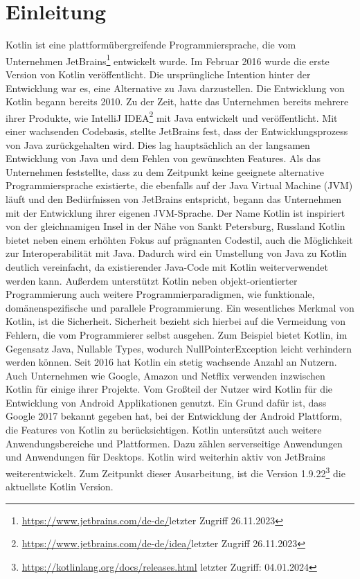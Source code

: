 \documentclass{article}
\begin{document}
\section{Einleitung}
Kotlin ist eine plattformübergreifende Programmiersprache, die vom Unternehmen JetBrains\footnote{\url{https://www.jetbrains.com/de-de/}letzter Zugriff 26.11.2023} entwickelt wurde. Im Februar 2016 wurde die erste Version von Kotlin veröffentlicht. Die ursprüngliche Intention hinter der Entwicklung war es, eine Alternative zu Java darzustellen. Die Entwicklung von Kotlin begann bereits 2010. Zu der Zeit, hatte das Unternehmen bereits mehrere ihrer Produkte, wie IntelliJ IDEA\footnote{\url{https://www.jetbrains.com/de-de/idea/}letzter Zugriff 26.11.2023} mit Java entwickelt und veröffentlicht. Mit einer wachsenden Codebasis, stellte JetBrains fest, dass der Entwicklungsprozess von Java zurückgehalten wird. Dies lag hauptsächlich an der langsamen Entwicklung von Java und dem Fehlen von gewünschten Features. Als das Unternehmen feststellte, dass zu dem Zeitpunkt keine geeignete alternative Programmiersprache existierte, die ebenfalls auf der Java Virtual Machine (JVM) läuft und den Bedürfnissen von JetBrains entspricht, begann das Unternehmen mit der Entwicklung ihrer eigenen JVM-Sprache. Der Name Kotlin ist inspiriert von der gleichnamigen Insel in der Nähe von Sankt Petersburg, Russland\cite{Kotlin_In-D} \newline
Kotlin bietet neben einem erhöhten Fokus auf prägnanten Codestil, auch die Möglichkeit zur Interoperabilität mit Java. Dadurch wird ein Umstellung von Java zu Kotlin deutlich vereinfacht, da existierender Java-Code mit Kotlin weiterverwendet werden kann. Außerdem unterstützt Kotlin neben objekt-orientierter Programmierung auch weitere Programmierparadigmen, wie funktionale, domänenspezifische und parallele Programmierung. Ein wesentliches Merkmal von Kotlin, ist die Sicherheit. Sicherheit bezieht sich hierbei auf die Vermeidung von Fehlern, die vom Programmierer selbst ausgehen. Zum Beispiel bietet Kotlin, im Gegensatz Java, Nullable Types, wodurch NullPointerException leicht verhindern werden können. Seit 2016 hat Kotlin ein stetig wachsende Anzahl an Nutzern. Auch Unternehmen wie Google, Amazon und Netflix verwenden inzwischen Kotlin für einige ihrer Projekte. Vom Großteil der Nutzer wird Kotlin für die Entwicklung von Android Applikationen genutzt. Ein Grund dafür ist, dass Google 2017 bekannt gegeben hat, bei der Entwicklung der Android Plattform, die Features von Kotlin zu berücksichtigen. Kotlin untersützt auch weitere Anwendungsbereiche und Plattformen. Dazu zählen serverseitige Anwendungen und Anwendungen für Desktops. Kotlin wird weiterhin aktiv von JetBrains weiterentwickelt. Zum Zeitpunkt dieser Ausarbeitung, ist die Version 1.9.22\footnote{\url{https://kotlinlang.org/docs/releases.html} letzter Zugriff: 04.01.2024} die aktuellste Kotlin Version. \cite{Kotlin_In-D}
\end{document}
